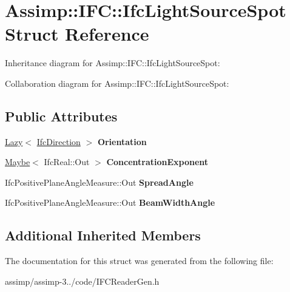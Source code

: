 \hypertarget{struct_assimp_1_1_i_f_c_1_1_ifc_light_source_spot}{\section{Assimp\+:\+:I\+F\+C\+:\+:Ifc\+Light\+Source\+Spot Struct Reference}
\label{struct_assimp_1_1_i_f_c_1_1_ifc_light_source_spot}
}


Inheritance diagram for Assimp\+:\+:I\+F\+C\+:\+:Ifc\+Light\+Source\+Spot\+:


Collaboration diagram for Assimp\+:\+:I\+F\+C\+:\+:Ifc\+Light\+Source\+Spot\+:
\subsection*{Public Attributes}
\begin{DoxyCompactItemize}
\item 
\hypertarget{struct_assimp_1_1_i_f_c_1_1_ifc_light_source_spot_a7cc5f6f50499344962672eab1e99d558}{\hyperlink{struct_assimp_1_1_s_t_e_p_1_1_lazy}{Lazy}$<$ \hyperlink{struct_assimp_1_1_i_f_c_1_1_ifc_direction}{Ifc\+Direction} $>$ {\bfseries Orientation}}\label{struct_assimp_1_1_i_f_c_1_1_ifc_light_source_spot_a7cc5f6f50499344962672eab1e99d558}

\item 
\hypertarget{struct_assimp_1_1_i_f_c_1_1_ifc_light_source_spot_a5033f63ad8423df01654e64f87587005}{\hyperlink{struct_assimp_1_1_s_t_e_p_1_1_maybe}{Maybe}$<$ Ifc\+Real\+::\+Out $>$ {\bfseries Concentration\+Exponent}}\label{struct_assimp_1_1_i_f_c_1_1_ifc_light_source_spot_a5033f63ad8423df01654e64f87587005}

\item 
\hypertarget{struct_assimp_1_1_i_f_c_1_1_ifc_light_source_spot_a09ffdbe8a979c8a38fde93210124cb47}{Ifc\+Positive\+Plane\+Angle\+Measure\+::\+Out {\bfseries Spread\+Angle}}\label{struct_assimp_1_1_i_f_c_1_1_ifc_light_source_spot_a09ffdbe8a979c8a38fde93210124cb47}

\item 
\hypertarget{struct_assimp_1_1_i_f_c_1_1_ifc_light_source_spot_ad54ea7c8a8173ae6a5c39c929789edb6}{Ifc\+Positive\+Plane\+Angle\+Measure\+::\+Out {\bfseries Beam\+Width\+Angle}}\label{struct_assimp_1_1_i_f_c_1_1_ifc_light_source_spot_ad54ea7c8a8173ae6a5c39c929789edb6}

\end{DoxyCompactItemize}
\subsection*{Additional Inherited Members}


The documentation for this struct was generated from the following file\+:\begin{DoxyCompactItemize}
\item 
assimp/assimp-\/3../code/I\+F\+C\+Reader\+Gen.\+h\end{DoxyCompactItemize}
